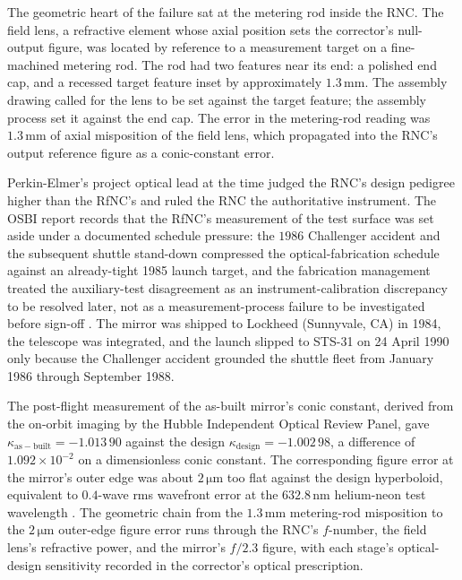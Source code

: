 The geometric heart of the failure sat at the metering rod inside
the RNC. The field lens, a refractive element whose axial position
sets the corrector's null-output figure, was located by reference to
a measurement target on a fine-machined metering rod. The rod had
two features near its end: a polished end cap, and a recessed
target feature inset by approximately $1.3 \,\si{\milli\meter}$.
The assembly drawing called for the lens to be set against the
target feature; the assembly process set it against the end cap.
The error in the metering-rod reading was $1.3 \,\si{\milli\meter}$
of axial misposition of the field lens, which propagated into the
RNC's output reference figure as a conic-constant error.

Perkin-Elmer's project optical lead at the time judged the RNC's
design pedigree higher than the RfNC's and ruled the RNC the
authoritative instrument. The OSBI report records that the RfNC's
measurement of the test surface was set aside under a documented
schedule pressure: the $1986$ Challenger accident and the
subsequent shuttle stand-down compressed the optical-fabrication
schedule against an already-tight 1985 launch target, and the
fabrication management treated the auxiliary-test disagreement as
an instrument-calibration discrepancy to be resolved later, not as
a measurement-process failure to be investigated before sign-off
\cite{acc:nasa-hubble-optical-systems-1990,ch07t3-text:smith-hubble-history-1989}.
The mirror was shipped to Lockheed (Sunnyvale, CA) in 1984, the
telescope was integrated, and the launch slipped to STS-31 on 24
April 1990 only because the Challenger accident grounded the shuttle
fleet from January 1986 through September 1988.

The post-flight measurement of the as-built mirror's conic
constant, derived from the on-orbit imaging by the Hubble
Independent Optical Review Panel, gave $\kappa_{\mathrm{as-built}} =
-1.013\,90$ against the design $\kappa_{\mathrm{design}} = -1.002\,98$,
a difference of $1.092 \times 10^{-2}$ on a dimensionless conic
constant. The corresponding figure error at the mirror's outer
edge was about $2 \,\si{\micro\meter}$ too flat against the design
hyperboloid, equivalent to $0.4$-wave rms wavefront error at the
$632.8 \,\si{\nano\meter}$ helium-neon test wavelength
\cite{acc:nasa-hubble-optical-systems-1990}. The geometric chain
from the $1.3 \,\si{\milli\meter}$ metering-rod misposition to the
$2 \,\si{\micro\meter}$ outer-edge figure error runs through the
RNC's $f$-number, the field lens's refractive power, and the
mirror's $f/2.3$ figure, with each stage's optical-design sensitivity
recorded in the corrector's optical prescription.

